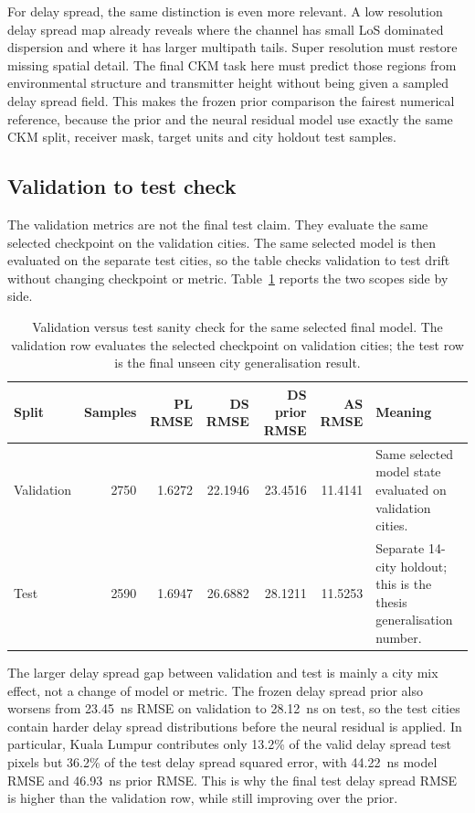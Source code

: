 For delay spread, the same distinction is even more relevant. A low resolution
delay spread map already reveals where the channel has small LoS dominated
dispersion and where it has larger multipath tails. Super resolution must
restore missing spatial detail. The final CKM task here must predict those
regions from environmental structure and transmitter height without being
given a sampled delay spread field. This makes the frozen prior comparison the
fairest numerical reference, because the prior and the neural residual model
use exactly the same CKM split, receiver mask, target units and city holdout
test samples.

\subsection{Validation to test check}

The validation metrics are not the final test claim. They evaluate the same
selected checkpoint on the validation cities. The same selected model is then
evaluated on the separate test cities, so the table checks validation to test
drift without changing checkpoint or metric.
Table~\ref{tab:try80_val_test_sanity} reports the two scopes side by side.

\begin{table}[!htbp]
\centering
\caption[Validation versus test sanity check.]%
{Validation versus test sanity check for the same selected final model. The
validation row evaluates the selected checkpoint on validation cities; the
test row is the final unseen city generalisation result.}
\label{tab:try80_val_test_sanity}
\scriptsize
\begin{tabularx}{\textwidth}{lrrrrr>{\raggedright\arraybackslash}X}
\toprule
Split & Samples & PL RMSE & DS RMSE & DS prior RMSE & AS RMSE & Meaning \\
\midrule
Validation & 2750 & 1.6272 & 22.1946 & 23.4516 & 11.4141 & Same selected model state evaluated on validation cities. \\
Test & 2590 & 1.6947 & 26.6882 & 28.1211 & 11.5253 & Separate 14-city holdout; this is the thesis generalisation number. \\
\bottomrule
\end{tabularx}
\end{table}

The larger delay spread gap between validation and test is mainly a city mix
effect, not a change of model or metric. The frozen delay spread prior
also worsens from \SI{23.45}{ns} RMSE on validation to \SI{28.12}{ns} on test,
so the test cities contain harder delay spread distributions before the neural
residual is applied. In particular, Kuala Lumpur contributes only 13.2\% of
the valid delay spread test pixels but 36.2\% of the test delay spread squared
error, with \SI{44.22}{ns} model RMSE and \SI{46.93}{ns} prior RMSE. This is
why the final test delay spread RMSE is higher than the validation
row, while still improving over the prior.

